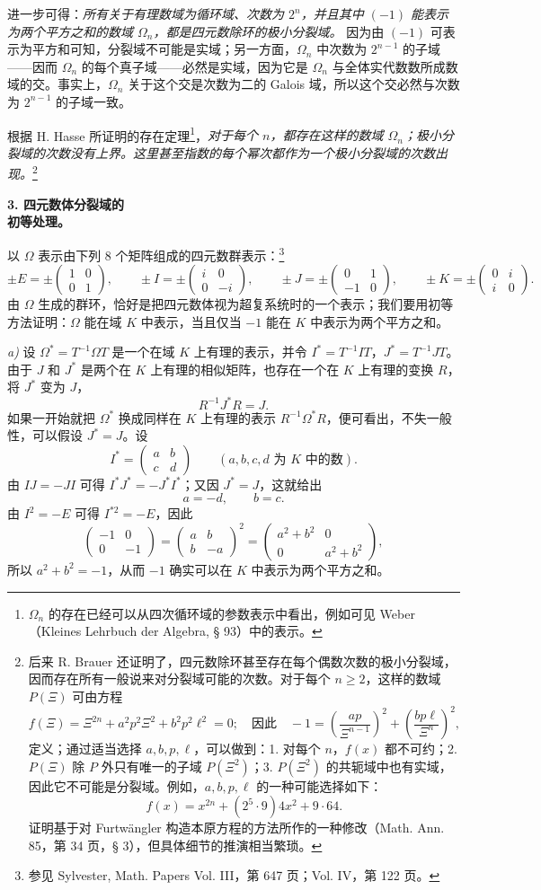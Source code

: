 \documentclass[11pt]{article}
\providecommand{\srcspaced}[1]{\emph{#1}}
\providecommand{\mat}[1]{\begin{pmatrix}#1\end{pmatrix}}
\begin{document}
进一步可得：\srcspaced{所有关于有理数域为循环域、次数为 $2^n$，并且其中 $(-1)$ 能表示为两个平方之和的数域 $\Omega_n$，都是四元数除环的极小分裂域。} 因为由 $(-1)$ 可表示为平方和可知，分裂域不可能是实域；另一方面，$\Omega_n$ 中次数为 $2^{n-1}$ 的子域——因而 $\Omega_n$ 的每个真子域——必然是实域，因为它是 $\Omega_n$ 与全体实代数数所成数域的交。事实上，$\Omega_n$ 关于这个交是次数为二的 Galois 域，所以这个交必然与次数为 $2^{n-1}$ 的子域一致。

根据 H. Hasse 所证明的存在定理\footnote{$\Omega_n$ 的存在已经可以从四次循环域的参数表示中看出，例如可见 Weber（Kleines Lehrbuch der Algebra, § 93）中的表示。}，\srcspaced{对于每个 $n$，都存在这样的数域 $\Omega_n$；极小分裂域的次数没有上界。这里甚至指数的每个幂次都作为一个极小分裂域的次数出现。}\footnote{后来 R. Brauer 还证明了，四元数除环甚至存在每个偶数次数的极小分裂域，因而存在所有一般说来对分裂域可能的次数。对于每个 $n\ge2$，这样的数域 $P(\Xi)$ 可由方程
\[
 f(\Xi)=\Xi^{2n}+a^2p^2\Xi^2+b^2p^2\ell^2=0;
\quad \text{因此}\quad -1=\left(\frac{ap}{\Xi^{n-1}}\right)^2+
        \left(\frac{bp\ell}{\Xi^n}\right)^2,
\]
定义；通过适当选择 $a,b,p,\ell$，可以做到：1. 对每个 $n$，$f(x)$ 都不可约；2. $P(\Xi)$ 除 $P$ 外只有唯一的子域 $P(\Xi^2)$；3. $P(\Xi^2)$ 的共轭域中也有实域，因此它不可能是分裂域。例如，$a,b,p,\ell$ 的一种可能选择如下：
\[
        f(x)=x^{2n}+(2^5\cdot9)4x^2+9\cdot64.
\]
证明基于对 Furtwängler 构造本原方程的方法所作的一种修改（Math. Ann. 85，第 34 页，§ 3），但具体细节的推演相当繁琐。}
\begin{center}
\textbf{3. 四元数体分裂域的\\
初等处理。}
\end{center}

以 $\Omega$ 表示由下列 8 个矩阵组成的四元数群表示：\footnote{参见 Sylvester, Math. Papers Vol. III，第 647 页；Vol. IV，第 122 页。}
\[
\pm E=\pm\mat{1&0\\0&1},\qquad
\pm I=\pm\mat{i&0\\0&-i},\qquad
\pm J=\pm\mat{0&1\\-1&0},\qquad
\pm K=\pm\mat{0&i\\ i&0}.
\]
由 $\Omega$ 生成的群环，恰好是把四元数体视为超复系统时的一个表示；我们要用初等方法证明：$\Omega$ 能在域 $K$ 中表示，当且仅当 $-1$ 能在 $K$ 中表示为两个平方之和。

\emph{a)} 设 $\Omega^*=T^{-1}\Omega T$ 是一个在域 $K$ 上有理的表示，并令 $I^*=T^{-1}IT$，$J^*=T^{-1}JT$。由于 $J$ 和 $J^*$ 是两个在 $K$ 上有理的相似矩阵，也存在一个在 $K$ 上有理的变换 $R$，将 $J^*$ 变为 $J$，
\[
        R^{-1}J^*R=J.
\]
如果一开始就把 $\Omega^*$ 换成同样在 $K$ 上有理的表示 $R^{-1}\Omega^*R$，便可看出，不失一般性，可以假设 $J^*=J$。设
\[
        I^*=\mat{a&b\\ c&d}\qquad (a,b,c,d\text{ 为 }K\text{ 中的数}).
\]
由 $IJ=-JI$ 可得 $I^*J^*=-J^*I^*$；又因 $J^*=J$，这就给出
\[
        a=-d,
        \qquad b=c.
\]
由 $I^2=-E$ 可得 $I^{*2}=-E$，因此
\[
        \mat{-1&0\\0&-1}=\mat{a&b\\ b&-a}^2
        =\mat{a^2+b^2&0\\0&a^2+b^2},
\]
所以 $a^2+b^2=-1$，从而 $-1$ 确实可以在 $K$ 中表示为两个平方之和。
\end{document}
